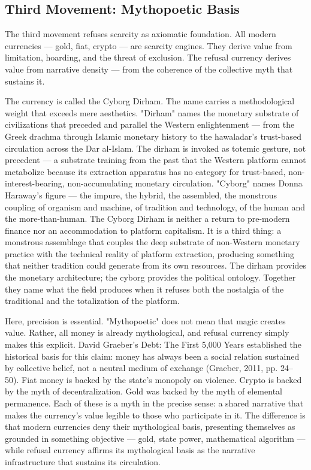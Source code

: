 \subsection{Third Movement: Mythopoetic Basis}

The third movement refuses scarcity as axiomatic foundation. All modern currencies — gold, fiat, crypto — are scarcity engines. They derive value from limitation, hoarding, and the threat of exclusion. The refusal currency derives value from narrative density — from the coherence of the collective myth that sustains it.

The currency is called the Cyborg Dirham. The name carries a methodological weight that exceeds mere aesthetics. "Dirham" names the monetary substrate of civilizations that preceded and parallel the Western enlightenment — from the Greek drachma through Islamic monetary history to the hawaladar's trust-based circulation across the Dar al-Islam. The dirham is invoked as totemic gesture, not precedent — a substrate training from the past that the Western platform cannot metabolize because its extraction apparatus has no category for trust-based, non-interest-bearing, non-accumulating monetary circulation. "Cyborg" names Donna Haraway's figure — the impure, the hybrid, the assembled, the monstrous coupling of organism and machine, of tradition and technology, of the human and the more-than-human. The Cyborg Dirham is neither a return to pre-modern finance nor an accommodation to platform capitalism. It is a third thing: a monstrous assemblage that couples the deep substrate of non-Western monetary practice with the technical reality of platform extraction, producing something that neither tradition could generate from its own resources. The dirham provides the monetary architecture; the cyborg provides the political ontology. Together they name what the field produces when it refuses both the nostalgia of the traditional and the totalization of the platform.

Here, precision is essential. "Mythopoetic" does not mean that magic creates value. Rather, all money is already mythological, and refusal currency simply makes this explicit. David Graeber's Debt: The First 5,000 Years established the historical basis for this claim: money has always been a social relation sustained by collective belief, not a neutral medium of exchange (Graeber, 2011, pp. 24–50). Fiat money is backed by the state's monopoly on violence. Crypto is backed by the myth of decentralization. Gold was backed by the myth of elemental permanence. Each of these is a myth in the precise sense: a shared narrative that makes the currency's value legible to those who participate in it. The difference is that modern currencies deny their mythological basis, presenting themselves as grounded in something objective — gold, state power, mathematical algorithm — while refusal currency affirms its mythological basis as the narrative infrastructure that sustains its circulation.

